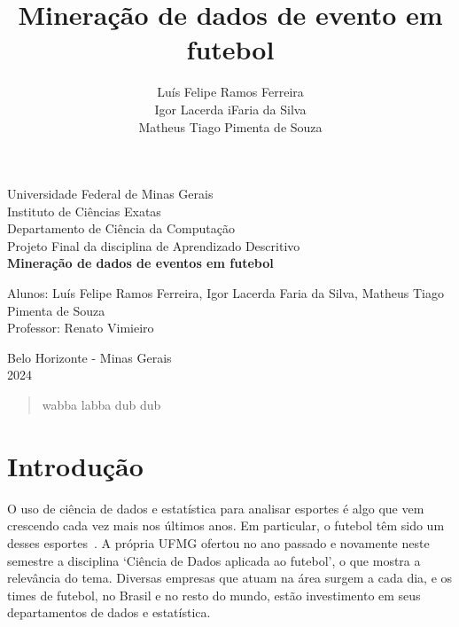 \documentclass{article}
\begin{document}
\begin{titlepage}
	\begin{center}
		{\large Universidade Federal de Minas Gerais}\\[0.2cm]
		{\large Instituto de Ciências Exatas}\\[0.2cm]
		{\large Departamento de Ciência da Computação}\\[0.2cm]
		{\large Projeto Final da disciplina de Aprendizado Descritivo}\\[5.1cm]
		{\large \bf Mineração de dados de eventos em futebol}\\[5.1cm]
	\end{center}
	{\large Alunos: Luís Felipe Ramos Ferreira, Igor Lacerda Faria da Silva,
	Matheus Tiago Pimenta de Souza}\\[0.7cm]
	{\large Professor: Renato Vimieiro}\\[5.1cm]
	\begin{center}
		{\large Belo Horizonte - Minas Gerais}\\[0.2cm]
		{\large 2024}
	\end{center}
\end{titlepage}

\newpage
\begin{quote}
	wabba labba dub dub
\end{quote}

\newpage
\renewcommand{\contentsname}{Sumário}
\tableofcontents
\newpage

\title{Mineração de dados de evento em futebol}
\author{Luís Felipe Ramos Ferreira \\  Igor Lacerda iFaria da Silva \\ Matheus
	Tiago Pimenta de Souza}

\maketitle

\section{Introdução}

O uso de ciência de dados e estatística para analisar esportes é algo que vem
crescendo cada vez mais nos últimos anos. Em
particular, o futebol têm sido um desses
esportes~\cite{takvorian2021beautiful}. A própria UFMG ofertou no
ano passado e novamente neste semestre a disciplina `Ciência de Dados aplicada
ao futebol', o que mostra a relevância do tema. Diversas empresas que atuam na
área surgem a cada dia, e os times de futebol, no Brasil e no resto do
mundo, estão investimento em seus departamentos de dados e estatística.
\end{document}

